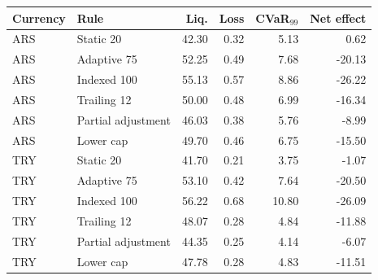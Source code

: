 \begin{tabular}{llrrrr}
\toprule
Currency & Rule & Liq. & Loss & CVaR$_{99}$ & Net effect \\
\midrule
ARS & Static 20 & 42.30 & 0.32 & 5.13 & 0.62 \\
ARS & Adaptive 75 & 52.25 & 0.49 & 7.68 & -20.13 \\
ARS & Indexed 100 & 55.13 & 0.57 & 8.86 & -26.22 \\
ARS & Trailing 12 & 50.00 & 0.48 & 6.99 & -16.34 \\
ARS & Partial adjustment & 46.03 & 0.38 & 5.76 & -8.99 \\
ARS & Lower cap & 49.70 & 0.46 & 6.75 & -15.50 \\
TRY & Static 20 & 41.70 & 0.21 & 3.75 & -1.07 \\
TRY & Adaptive 75 & 53.10 & 0.42 & 7.64 & -20.50 \\
TRY & Indexed 100 & 56.22 & 0.68 & 10.80 & -26.09 \\
TRY & Trailing 12 & 48.07 & 0.28 & 4.84 & -11.88 \\
TRY & Partial adjustment & 44.35 & 0.25 & 4.14 & -6.07 \\
TRY & Lower cap & 47.78 & 0.28 & 4.83 & -11.51 \\
\bottomrule
\end{tabular}
